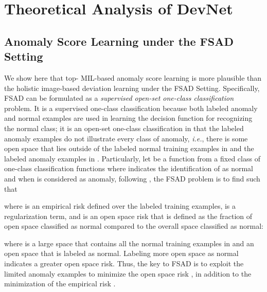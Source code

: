 \documentclass[10pt,journal,compsoc]{IEEEtran}
\newcommand{\ie}{\textit{i.e.}}
\begin{document}
\section{Theoretical Analysis of DevNet}

\subsection{Anomaly Score Learning under the FSAD Setting}\label{subsec:fsad_analysis}

We show here that top- MIL-based anomaly score learning is more plausible than the holistic image-based deviation learning under the FSAD Setting. Specifically, FSAD can be formulated as a \textit{supervised open-set one-class classification} problem. It is a supervised one-class classification because both labeled anomaly and normal examples are used in learning the decision function for recognizing the normal class; it is an open-set one-class classification in that the labeled anomaly examples do not illustrate every class of anomaly, \ie, there is some open space  that lies outside of the labeled normal training examples in  and the labeled anomaly examples in . Particularly, let  be a function from a fixed class of one-class classification functions where  indicates the identification of  as normal and  when  is considered as anomaly, following \cite{scheirer2012toward}, the FSAD problem is to find  such that

where  is an empirical risk defined over the labeled training examples,  is a regularization term, and  is an open space risk that is defined as the fraction of open space classified as normal compared to the overall space classified as normal:

where  is a large space that contains all the normal training examples in  and an open space  that is labeled as normal. Labeling more open space as normal indicates a greater open space risk. Thus, the key to FSAD is to exploit the limited anomaly examples to minimize the open space risk , in addition to the minimization of the empirical risk .
\end{document}
